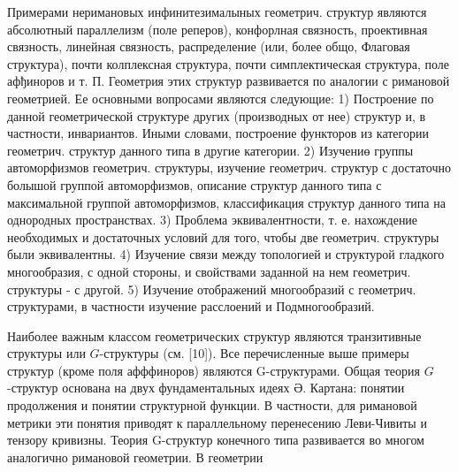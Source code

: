 \documentclass[10pt]{article}
\begin{document}
Примерами неримановых инфинитезималыных геометрич. структур являются абсолютный параллелизм (поле реперов), конфорлная связность, проективная связность, линейная связность, распределение (или, более общо, Флаговая структура), почти колплексная структура, почти симплектическая структура, поле афђиноров и т. П. Геометрия этих структур развивается по аналогии с римановой геометрией. Ее основными вопросами являются следующие: 1) Построение по данной геометрической структуре других (производных от нее) структур и, в частности, инвариантов. Иными словами, построение функторов из категории геометрич. структур данного типа в другие категории. 2) Изучениө группы автоморфизмов геометрич. структуры, изучение геометрич. структур с достаточно болышой группой автоморфизмов, описание структур данного типа с максимальной группой автоморфизмов, классификация структур данного типа на однородных пространствах. 3) Проблема эквивалентности, т. е. нахождение необходимых и достаточных условий для того, чтобы две геометрич. структуры были эквивалентны. 4) Изучение связи между топологией и структурой гладкого многообразия, с одной стороны, и свойствами заданной на нем геометрич. структуры - с другой. 5) Изучение отображений многообразий с геометрич. структурами, в частности изучение расслоений и Подмногообразий.



Наиболее важным классом геометрических структур являются транзитивные структуры или $G$-структуры (см. [10]). Все перечисленные выше примеры структур (кроме поля афффиноров) являются G-структурами. Общая теория $G$-структур основана на двух фундаментальных идеях Ә. Картана: понятии продолжения и понятии структурной функции. В частности, для римановой метрики эти понятия приводят к параллельному перенесению Леви-Чивиты и тензору кривизны. Теория G-структур конечного типа развивается во многом аналогично римановой геометрии. В геометрии
\end{document}
